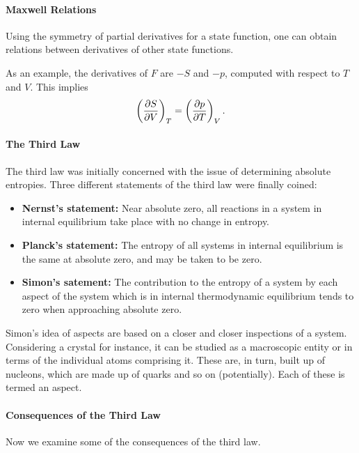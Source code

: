 

\paragraph{Maxwell Relations}
Using the symmetry of partial derivatives for a state function, one can obtain relations between derivatives of other state functions.

As an example, the derivatives of $F$ are $-S$ and $-p$, computed with respect to $T$ and $V$. This implies
\begin{align*}
	\left(\pdv{S}{V}\right)_{T} = \left(\pdv{p}{T}\right)_{V}.
\end{align*}

\paragraph{The Third Law}
The third law was initially concerned with the issue of determining absolute entropies. Three different statements of the third law were finally coined:

\begin{itemize}
	\item \textbf{Nernst's statement:} Near absolute zero, all reactions in a system in internal equilibrium take place with no change in entropy.
	\item \textbf{Planck's statement:} The entropy of all systems in internal equilibrium is the same at absolute zero, and may be taken to be zero.
	\item \textbf{Simon's satement:} The contribution to the entropy of a system by each aspect of the system which is in internal thermodynamic equilibrium tends to zero when approaching absolute zero.
\end{itemize}

Simon's idea of aspects are based on a closer and closer inspections of a system. Considering a crystal for instance, it can be studied as a macroscopic entity or in terms of the individual atoms comprising it. These are, in turn, built up of nucleons, which are made up of quarks and so on (potentially). Each of these is termed an aspect.

\paragraph{Consequences of the Third Law}
Now we examine some of the consequences of the third law.

